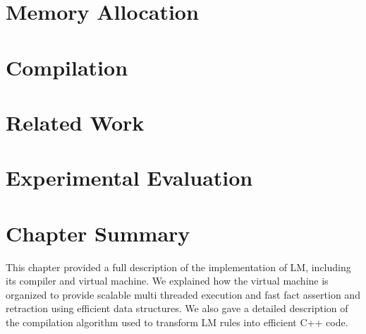 


\section{Memory Allocation}


\section{Compilation}


\section{Related Work}


\section{Experimental Evaluation}
\section{Chapter Summary}

This chapter provided a full description of the implementation of LM, including
its compiler and virtual machine. We explained how the virtual machine is
organized to provide scalable multi threaded execution and fast fact assertion
and retraction using efficient data structures. We also gave a detailed
description of the compilation algorithm used to transform LM rules into
efficient C++ code.

